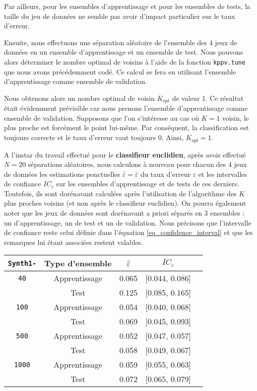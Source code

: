 \documentclass{article}
\begin{document}
\begin{multicols}{2}
Par ailleurs, pour les ensembles d'apprentissage et pour les ensembles de tests, la taille du jeu de données ne semble pas avoir d'impact particulier sur le taux d'erreur. 

Ensuite, nous effectuons une séparation aléatoire de l’ensemble des $4$ jeux de données en un ensemble d’apprentissage et un ensemble de test. Nous pouvons alors déterminer le nombre optimal de voisins à l’aide de la fonction \texttt{kppv.tune} que nous avons précédemment codé. Ce calcul se fera en utilisant l’ensemble d’apprentissage comme ensemble de validation. 

Nous obtenons alors un nombre optimal de voisin $K_{opt}$ de valeur $1$. Ce résultat était évidemment prévisible car nous prenons l’ensemble d’apprentissage comme ensemble de validation. Supposons que l'on s'intéresse au cas où $K=1$ voisin, le plus proche est forcément le point lui-même. Par conséquent, la classification est toujours correcte et le taux d’erreur vaut toujours $0$. Ainsi, $K_{opt} = 1$.

A l'instar du travail effectué pour le \textbf{classifieur euclidien}, après avoir effectué $N=20$ séparations aléatoires, nous calculons à nouveau pour chacun des $4$ jeux de données les estimations ponctuelles  $\widehat{\varepsilon} = \bar{\varepsilon}$ du taux d’erreur $\varepsilon$ et les intervalles de confiance $IC_\varepsilon$ sur les ensembles d’apprentissage et de tests de ces derniers. Toutefois, ils sont dorénavant calculées après l'utilisation de l'algorithme des $K$ plus proches voisins (et non après le classifieur euclidien). On pourra également noter que les jeux de données sont dorénavant a priori séparés en $3$ ensembles : un d'apprentissage, un de test et un de validation. Nous précisons que l'intervalle de confiance reste celui définie dans l'équation \ref{eq_confidence_interval} et que les remarques lui étant associées restent valables.

{\footnotesize
\begin{center}
\begin{tabular}{|c||c|c|c|c|}
\hline
\texttt{Synth1-} & Type d'ensemble & $\widehat{\varepsilon}$  & $IC_\varepsilon$  \\
\hline
\hline
\texttt{40} & Apprentissage & 0.065 & [0.044,  0.086] \\
\cline{2-4}
 & Test & 0.125 & [0.085, 0.165] \\
\hline
\hline
\texttt{100} & Apprentissage &  0.054 & [0.040, 0.068] \\
\cline{2-4}
 & Test & 0.069 & [0.045, 0.093] \\
\hline
\hline
\texttt{500} & Apprentissage & 0.052 & [0.047, 0.057] \\
\cline{2-4}
 & Test & 0.058 & [0.049, 0.067] \\
\hline
\hline
\texttt{1000} & Apprentissage & 0.059 & [0.055, 0.063] \\
\cline{2-4}
 & Test & 0.072 & [0.065, 0.079] \\
\hline
\end{tabular}
\end{center}
}


\end{multicols}
\end{document}
